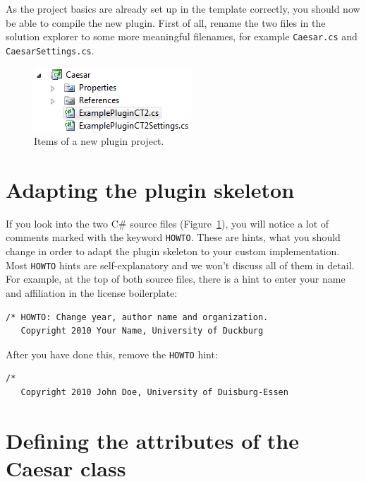 As the project basics are already set up in the template correctly, you should now be able to compile the new plugin. First of all, rename the two files in the solution explorer to some more meaningful filenames, for example \texttt{Caesar.cs} and \texttt{CaesarSettings.cs}.

\begin{figure}
	\centering
		\includegraphics{figures/caesar_project.png}
	\caption{Items of a new plugin project.}
	\label{fig:caesar_project}
\end{figure}

\section{Adapting the plugin skeleton}
\label{AdaptingThePluginSkeleton}

If you look into the two C\# source files (Figure~\ref{fig:caesar_project}), you will notice a lot of comments marked with the keyword \texttt{HOWTO}. These are hints, what you should change in order to adapt the plugin skeleton to your custom implementation. Most \texttt{HOWTO} hints are self-explanatory and we won't discuss all of them in detail. For example, at the top of both source files, there is a hint to enter your name and affiliation in the license boilerplate:

\begin{lstlisting}
/* HOWTO: Change year, author name and organization.
   Copyright 2010 Your Name, University of Duckburg

\end{lstlisting}

After you have done this, remove the \texttt{HOWTO} hint:

\begin{lstlisting}
/*
   Copyright 2010 John Doe, University of Duisburg-Essen

\end{lstlisting}

\section{Defining the attributes of the Caesar class}
\label{sec:DefiningTheAttributesOfTheCaesarClass}

